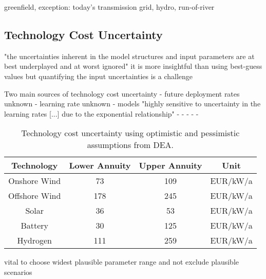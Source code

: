 greenfield, exception: today's transmission grid, hydro, run-of-river


\subsection{Technology Cost Uncertainty}
\label{sec:uncertainty}


"the uncertainties inherent in the model structures and input parameters are at best underplayed and at worst ignored" \cite{yue_review_2018}
it is more insightful than using best-guess values \cite{fraiture_robustness_2020}
but quantifying the input uncertainties is a challenge \cite{moret_characterization_2017}

Two main sources of technology cost uncertainty \cite{trondle_trade-offs_2020}
- future deployment rates unknown
- learning rate unknown
- models "highly sensitive to uncertainty in the learning rates [...] due to the exponential relationship" \cite{mattsson_learning_2019}
- \cite{yeh_review_2012}
- \cite{heuberger_power_2017}
- \cite{gritsevskyi_modeling_2000}
- \cite{schmidt_projecting_2019}
- \cite{schmidt_future_2017}


\begin{SCtable}
    \begin{small}
        \begin{tabular}{cccc}
            \toprule
            Technology & Lower Annuity & Upper Annuity & Unit  \\ \midrule
            Onshore Wind & 73 & 109 & EUR/kW/a \\
            Offshore Wind & 178 & 245 & EUR/kW/a \\ %
            Solar & 36 & 53 & EUR/kW/a \\
            Battery & 30 & 125 & EUR/kW/a \\
            Hydrogen & 111 & 259 & EUR/kW/a \\ \bottomrule
        \end{tabular}
    \end{small}
    \caption{Technology cost uncertainty using optimistic and pessimistic assumptions from DEA.}
    \label{tab:costuncertainty}
\end{SCtable}   

vital to choose widest plausible parameter range and not exclude plausible scenarios \cite{moret_characterization_2017,mccollum_energy_2020}

